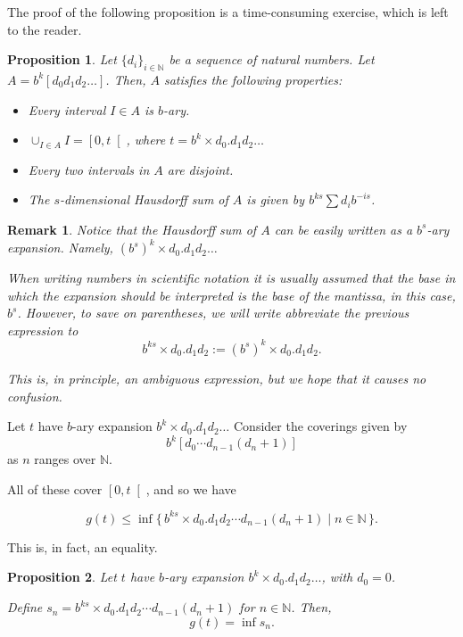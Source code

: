 \documentclass[11pt, reqno]{amsart}
\newcommand{\N}{\mathbb{N}}
\newtheorem{prop}{Proposition}
\newtheorem{remark}{Remark}
\begin{document}
The proof of the following proposition is a time-consuming exercise, which is left to the reader.

\begin{prop}
Let $\{d_i\}_{i \in \N}$ be a sequence of natural numbers. Let $A = b^k [d_0 d_1 d_2 \dots]$. Then, $A$ satisfies the following properties:

\begin{itemize}
\item Every interval $I \in A$ is $b$-ary.

\item $\cup_{I \in A} I = \left[ 0, t \right[$, where $t = b^k \times d_0 . d_1 d_2 \dots$

\item Every two intervals in $A$ are disjoint.

\item The $s$-dimensional Hausdorff sum of $A$ is given by $b^{ks} \sum d_i b^{-is}$.
\end{itemize}

\end{prop}

\begin{remark}
Notice that the Hausdorff sum of $A$ can be easily written as a $b^s$-ary expansion. Namely, $(b^s)^k \times d_0 . d_1 d_ 2 \dots$

When writing numbers in scientific notation it is usually assumed that the base in which the expansion should be interpreted is the base of the mantissa, in this case, $b^s$. However, to save on parentheses, we will write abbreviate the previous expression to
\[b^{ks} \times d_0 . d_1 d_ 2 := (b^s)^k \times d_0 . d_1 d_ 2.\]

This is, in principle, an ambiguous expression, but we hope that it causes no confusion.
\end{remark}

Let $t$ have $b$-ary expansion $b^k \times d_0 . d_1 d_2 \dots$ Consider the coverings given by
\[ b^k [d_0 \cdots d_{n-1} (d_n + 1)] \]
as $n$ ranges over $\N$.

All of these cover $\left[0, t\right[$, and so we have

\[ g(t) \leq \inf \{\, b^{ks} \times d_0 . d_1 d_2 \cdots d_{n-1} (d_n + 1) \mid n \in \N\,\}.\]

This is, in fact, an equality.

\begin{prop} \label{ginfs}
Let $t$ have $b$-ary expansion $b^k \times d_0 . d_1 d_2 \dots$, with $d_0 = 0$.

Define $s_n = b^{ks} \times d_0 . d_1 d_2 \cdots d_{n-1} (d_n + 1)$ for $n \in \N$. Then,
\[ g(t) = \inf s_n.\]
\end{prop}
\end{document}
